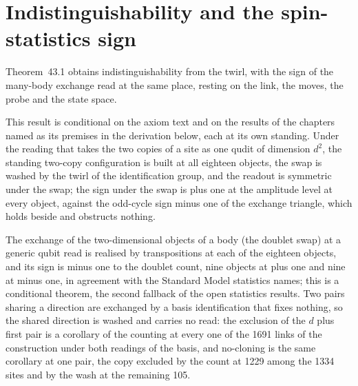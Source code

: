 \section{Indistinguishability and the spin-statistics sign}\label{mod:II-5-indistinguishability-and-the-spin-statistics-sign}
\label{narr:open:2-5}Theorem~43.1 obtains indistinguishability from the twirl, with the sign of the many-body exchange read at the same place, resting on the link, the moves, the probe and the state space.
\begin{chconditional}\label{box:II-5-indistinguishability-and-the-spin-statistics-sign:1}
This result is conditional on the axiom text and on the results of the chapters named as its premises in the derivation below, each at its own standing.
Under the reading that takes the two copies of a site as one qudit of dimension $d^2$, the standing two-copy configuration is built at all eighteen objects, the swap is washed by the twirl of the identification group, and the readout is symmetric under the swap; the sign under the swap is plus one at the amplitude level at every object, against the odd-cycle sign minus one of the exchange triangle, which holds beside and obstructs nothing.
\end{chconditional}
The exchange of the two-dimensional objects of a body (the doublet swap) at a generic qubit read is realised by transpositions at each of the eighteen objects, and its sign is minus one to the doublet count, nine objects at plus one and nine at minus one, in agreement with the Standard Model statistics names; this is a conditional theorem, the second fallback of the open statistics results.
Two pairs sharing a direction are exchanged by a basis identification that fixes nothing, so the shared direction is washed and carries no read: the exclusion of the $d$ plus first pair is a corollary of the counting at every one of the 1691 links of the construction under both readings of the basis, and no-cloning is the same corollary at one pair, the copy excluded by the count at 1229 among the 1334 sites and by the wash at the remaining 105.
